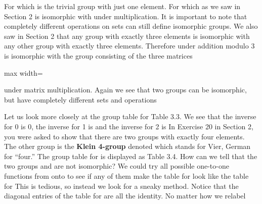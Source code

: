 \documentclass[11pt,oneside]{article}
\begin{document}
\begin{BookBody}
 For  which is the trivial group with just one element. For   which as we saw in Section 2 is isomorphic with  under multiplication. It is important to note that completely different operations on sets can still define isomorphic groups. We also saw in Section 2 that any group with exactly three elements is isomorphic with any other group with exactly three elements. Therefore  under addition modulo 3 is isomorphic with the group consisting of the three matrices

\begin{center}\begin{adjustbox}{max width=\linewidth}\end{adjustbox}\end{center}

\noindent under matrix multiplication. Again we see that two groups can be isomorphic, but have completely different sets and operations\BookEnd{\blacktriangle}


Let us look more closely at the group table for  Table 3.3. We see that the inverse for 0 is 0, the inverse for 1 is  and the inverse for 2 is  In Exercise 20 in Section 2, you were asked to show that there are two groups with exactly four elements. The other group is the\textbf{ Klein 4-group} denoted  which stands for Vier, German for “four.” The group table for  is displayed as Table 3.4. How can we tell that the two groups  and  are not isomorphic? We could try all possible one-to-one functions from  onto  to see if any of them make the table for  look like the table for  This is tedious, so instead we look for a sneaky method. Notice that the diagonal entries of the table for  are all the identity. No matter how we relabel


\end{BookBody}
\end{document}
